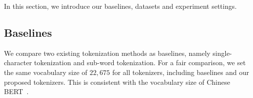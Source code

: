 


In this section, we introduce our baselines, datasets and experiment settings.






\subsection{Baselines}

We compare two existing tokenization methods as baselines, namely single-character tokenization and sub-word tokenization.  
For a fair comparison, we set the same vocabulary size of $22,675$ for all tokenizers, including baselines and our proposed tokenizers. This is consistent with the vocabulary size of Chinese BERT~\cite{BERT}. 



